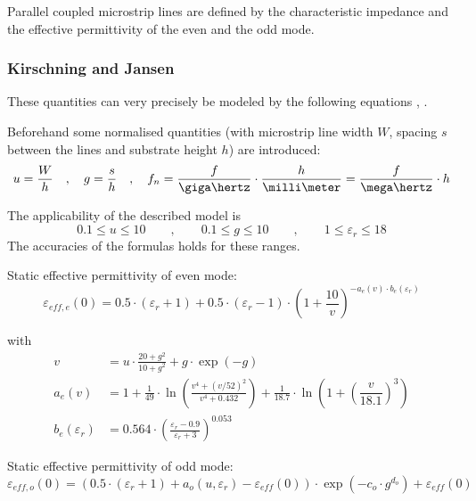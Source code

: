 \documentclass[10pt]{report}
\begin{document}
Parallel coupled microstrip lines are defined by the characteristic
impedance and the effective permittivity of the even and the odd mode.

\subsubsection{Kirschning and Jansen}

These quantities can very precisely be modeled by the following
equations \cite{Kirschning5}, \cite{Kirschning6}.

\addvspace{12pt}

Beforehand some normalised quantities (with microstrip line width $W$,
spacing $s$ between the lines and substrate height $h$) are
introduced:
\begin{equation}
u = \dfrac{W}{h} \quad,\quad g = \dfrac{s}{h} \quad,\quad
f_n = \dfrac{f}{\giga\hertz}\cdot\dfrac{h}{\milli\meter} = \dfrac{f}{\mega\hertz}\cdot h
\end{equation}

The applicability of the described model is
\begin{equation}
0.1\le u\le 10 \qquad,\qquad 0.1\le g\le 10 \qquad,\qquad 1\le \varepsilon_r\le 18
\end{equation}
The accuracies of the formulas holds for these ranges.

\addvspace{12pt}

Static effective permittivity of even mode:
\begin{equation}
\varepsilon_{eff,e}(0) = 0.5\cdot (\varepsilon_r+1) + 0.5\cdot (\varepsilon_r-1)\cdot
      \left( 1+\dfrac{10}{v} \right) ^{-a_e\left(v\right)\cdot b_e\left(\varepsilon_r\right)}
\end{equation}

with
\begin{align}
v &= u\cdot\frac{20+g^2}{10+g^2} + g\cdot\exp{\left(-g\right)}\\
a_e\left(v\right) &= 1 + \frac{1}{49}\cdot\ln\left( \frac{v^4 + \left( v/52 \right)^2}{v^4 + 0.432} \right)
    + \frac{1}{18.7}\cdot\ln\left( 1 + \left( \dfrac{v}{18.1} \right)^3 \right)\\
b_e\left(\varepsilon_r\right) &= 0.564\cdot\left( \frac{\varepsilon_r-0.9}{\varepsilon_r+3} \right)^{0.053}
\end{align}

Static effective permittivity of odd mode:
\begin{equation}
\varepsilon_{eff,o}(0) = \left(0.5\cdot \left(\varepsilon_r+1\right) + a_o\left(u,\varepsilon_r\right) - \varepsilon_{eff}(0) \right) \cdot
      \exp{\left(-c_o\cdot g^{d_o}\right)} + \varepsilon_{eff}(0)
\end{equation}
\end{document}
